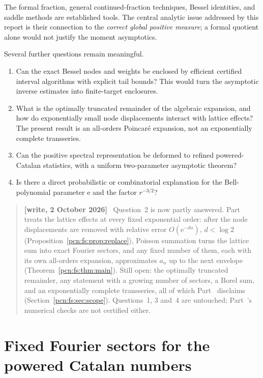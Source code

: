 \documentclass[11pt,letterpaper]{article}
\theoremstyle{remark}\newtheorem{remark}[theorem]{Remark}
\newcommand{\ee}{\mathrm e}
\newenvironment{writenote}{\par\smallskip\begin{quote}\small\textbf{[write, 2 October 2026]}\ }{\end{quote}\smallskip}
\begin{document}
The formal fraction, general continued-fraction techniques, Bessel identities, and saddle methods are established tools. The central analytic issue addressed by this report is their connection to the \emph{correct global positive measure}; a formal quotient alone would not justify the moment asymptotics.

Several further questions remain meaningful.
\begin{enumerate}
\item Can the exact Bessel nodes and weights be enclosed by efficient certified interval algorithms with explicit tail bounds? This would turn the asymptotic inverse estimates into finite-target enclosures.
\item What is the optimally truncated remainder of the algebraic expansion, and how do exponentially small node displacements interact with lattice effects? The present result is an all-orders Poincar\'e expansion, not an exponentially complete transseries.
\item Can the positive spectral representation be deformed to refined powered-Catalan statistics, with a uniform two-parameter asymptotic theorem?
\item Is there a direct probabilistic or combinatorial explanation for the Bell-polynomial parameter $\ee$ and the factor $r^{-3/2}$?
\end{enumerate}
\begin{writenote}
Question~2 is now partly answered. Part~\ref{pcn:part:fs} treats the lattice effects at every fixed exponential order: after the node displacements are removed with relative error $O(\ee^{-dn})$, $d<\log2$ (Proposition~\ref{pcn:fs:prop:replace}), Poisson summation turns the lattice sum into exact Fourier sectors, and any fixed number of them, each with its own all-orders expansion, approximates $a_n$ up to the next envelope (Theorem~\ref{pcn:fs:thm:main}). Still open: the optimally truncated remainder, any statement with a growing number of sectors, a Borel sum, and an exponentially complete transseries, all of which Part~\ref{pcn:part:fs} disclaims (Section~\ref{pcn:fs:sec:scope}). Questions~1, 3 and~4 are untouched; Part~\ref{pcn:part:fs}'s numerical checks are not certified either.
\end{writenote}


\part{Fixed Fourier sectors for the powered Catalan numbers}\label{pcn:part:fs}
\end{document}
